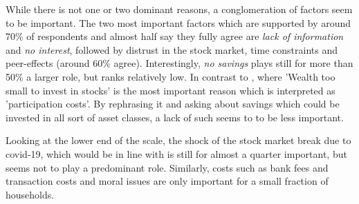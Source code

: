 \documentclass[ProjectABM]{subfiles}
\begin{document}
While there is not one or two dominant reasons, a conglomeration of factors seem to be important. The two most important factors which are supported by around 70\% of respondents and almost half say they fully agree are \textit{lack of information} and \textit{no interest}, followed by distrust in the stock market, time constraints and peer-effects (around 60\% agree). Interestingly, \textit{no savings} plays still for more than 50\% a larger role, but ranks relatively low. In contrast to \cite{choi_2020}, where 'Wealth too small to invest in stocks' is the most important reason which is interpreted as 'participation costs'. By rephrasing it and asking about savings which could be invested in all sort of asset classes, a lack of such seems to to be less important.

Looking at the lower end of the scale, the shock of the stock market break due to covid-19, which would be in line with \cite{malmendier_2011} is still for almost a quarter important, but seems not to play a predominant role. Similarly, costs such as bank fees and transaction costs and moral issues are only important for a small fraction of households.
\end{document}
